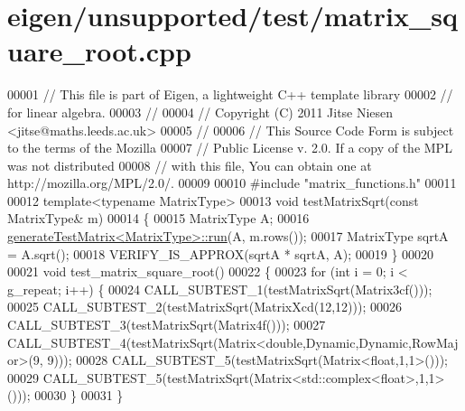 \hypertarget{eigen_2unsupported_2test_2matrix__square__root_8cpp_source}{}\section{eigen/unsupported/test/matrix\+\_\+square\+\_\+root.cpp}
\label{eigen_2unsupported_2test_2matrix__square__root_8cpp_source}

\begin{DoxyCode}
00001 \textcolor{comment}{// This file is part of Eigen, a lightweight C++ template library}
00002 \textcolor{comment}{// for linear algebra.}
00003 \textcolor{comment}{//}
00004 \textcolor{comment}{// Copyright (C) 2011 Jitse Niesen <jitse@maths.leeds.ac.uk>}
00005 \textcolor{comment}{//}
00006 \textcolor{comment}{// This Source Code Form is subject to the terms of the Mozilla}
00007 \textcolor{comment}{// Public License v. 2.0. If a copy of the MPL was not distributed}
00008 \textcolor{comment}{// with this file, You can obtain one at http://mozilla.org/MPL/2.0/.}
00009 
00010 \textcolor{preprocessor}{#include "matrix\_functions.h"}
00011 
00012 \textcolor{keyword}{template}<\textcolor{keyword}{typename} MatrixType>
00013 \textcolor{keywordtype}{void} testMatrixSqrt(\textcolor{keyword}{const} MatrixType& m)
00014 \{
00015   MatrixType A;
00016   \hyperlink{structgenerate_test_matrix}{generateTestMatrix<MatrixType>::run}(A, m.rows());
00017   MatrixType sqrtA = A.sqrt();
00018   VERIFY\_IS\_APPROX(sqrtA * sqrtA, A);
00019 \}
00020 
00021 \textcolor{keywordtype}{void} test\_matrix\_square\_root()
00022 \{
00023   \textcolor{keywordflow}{for} (\textcolor{keywordtype}{int} i = 0; i < g\_repeat; i++) \{
00024     CALL\_SUBTEST\_1(testMatrixSqrt(Matrix3cf()));
00025     CALL\_SUBTEST\_2(testMatrixSqrt(MatrixXcd(12,12)));
00026     CALL\_SUBTEST\_3(testMatrixSqrt(Matrix4f()));
00027     CALL\_SUBTEST\_4(testMatrixSqrt(Matrix<double,Dynamic,Dynamic,RowMajor>(9, 9)));
00028     CALL\_SUBTEST\_5(testMatrixSqrt(Matrix<float,1,1>()));
00029     CALL\_SUBTEST\_5(testMatrixSqrt(Matrix<std::complex<float>,1,1>()));
00030   \}
00031 \}
\end{DoxyCode}
